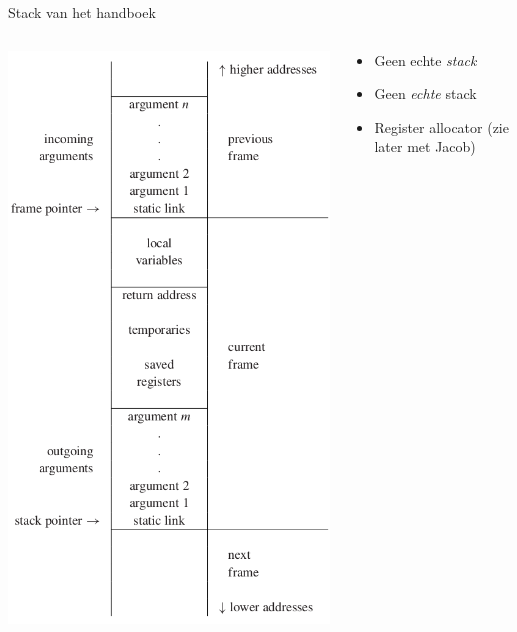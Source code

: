 \documentclass{beamer}
\begin{document}
\begin{frame}{Stack van het handboek}
	\begin{columns}
	    \begin{column}{.5\textwidth}
	        \includegraphics[height=\textheight]{theoretical_stack.png}
	    \end{column}
	    \begin{column}{.5\textwidth}
	        \begin{itemize}
	            \item Geen echte \emph{stack}
	            \item Geen \emph{echte} stack
	            \item Register allocator (zie later met Jacob)
	        \end{itemize}
	    \end{column}
	\end{columns}
\end{frame}
\end{document}

